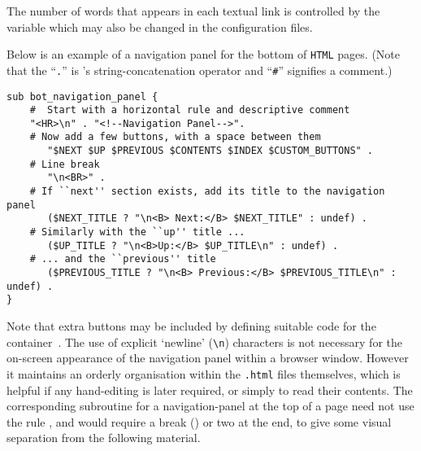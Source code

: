 \html{\\}\noindent
The number of words that appears in each textual link
is controlled by the variable 
which may also be changed in the configuration files.

\html{\\}\noindent
Below is an example of a navigation panel for the bottom of \texttt{HTML} pages.
(Note that the ``\texttt{.}'' is \Perl{}'s string-concatenation operator
and ``\texttt{\#}'' signifies a comment.)
\begin{small}
\begin{verbatim}
sub bot_navigation_panel {
    #  Start with a horizontal rule and descriptive comment
    "<HR>\n" . "<!--Navigation Panel-->".
    # Now add a few buttons, with a space between them
       "$NEXT $UP $PREVIOUS $CONTENTS $INDEX $CUSTOM_BUTTONS" .
    # Line break
       "\n<BR>" .
    # If ``next'' section exists, add its title to the navigation panel
       ($NEXT_TITLE ? "\n<B> Next:</B> $NEXT_TITLE" : undef) .
    # Similarly with the ``up'' title ...
       ($UP_TITLE ? "\n<B>Up:</B> $UP_TITLE\n" : undef) .
    # ... and the ``previous'' title
       ($PREVIOUS_TITLE ? "\n<B> Previous:</B> $PREVIOUS_TITLE\n" : undef) .
}
\end{verbatim}
\end{small}
Note that extra buttons may be included by defining suitable code for the container
\,.
The use of explicit `newline' (\verb|\n|) characters is not necessary for the
on-screen appearance of the navigation panel within a browser window. However
it maintains an orderly organisation within the \texttt{.html} files themselves,
which is helpful if any hand-editing is later required,
or simply to read their contents.
The corresponding subroutine for a navigation-panel at the top of a page
need not use the rule , and would require a break ()
or two at the end, to give some visual separation from the following material.




